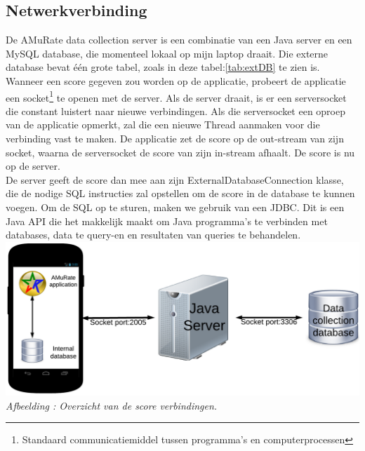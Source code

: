 \documentclass[11pt,a4paper]{article}
\newcounter{figc}
\newcommand{\figID} {%
   \stepcounter{figc}%
   \thefigc}
\begin{document}
	\subsection{Netwerkverbinding}
	\label{sec:Netwerkverbinding}
	De AMuRate data collection server is een combinatie van een Java server en een MySQL database, die momenteel lokaal op mijn laptop draait. Die externe database bevat één grote tabel, zoals in deze tabel:\ref{tab:extDB} te zien is. Wanneer een score gegeven zou worden op de applicatie, probeert de applicatie een socket\footnote{Standaard communicatiemiddel tussen programma's en computerprocessen} te openen met de server. Als de server draait, is er een serversocket die constant luistert naar nieuwe verbindingen. Als die serversocket een oproep van de applicatie opmerkt, zal die een nieuwe Thread aanmaken voor die verbinding vast te maken. De applicatie zet de score op de out-stream van zijn socket, waarna de serversocket de score van zijn in-stream afhaalt. De score is nu op de server. \\
De server geeft de score dan mee aan zijn ExternalDatabaseConnection klasse, die de nodige SQL instructies zal opstellen om de score in de database te kunnen voegen. Om de SQL op te sturen, maken we gebruik van een JDBC. Dit is een Java API die het makkelijk maakt om Java programma's te verbinden met databases, data te query-en en resultaten van queries te behandelen. \\

	\includegraphics[scale=1]{Pictures/datacollection.png} \newline
	\small \textit{Afbeelding \figID : Overzicht van de score verbindingen.} \\ \normalsize

	
\end{document}
